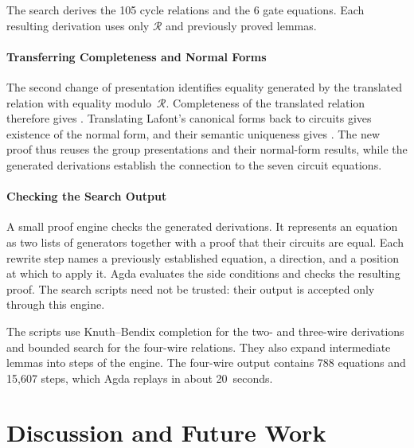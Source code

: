 \documentclass[acmsmall,screen,nonacm]{acmart}
\begin{document}
The search derives the 105 cycle relations and the 6 gate
equations. Each resulting derivation uses only $\mathcal{R}$ and
previously proved lemmas.

\paragraph{Transferring Completeness and Normal Forms}
The second change of presentation identifies equality generated
by the translated relation with equality modulo~$\mathcal{R}$.
Completeness of the translated relation therefore gives
. Translating Lafont's canonical forms
back to circuits gives existence of the normal form, and their
semantic uniqueness gives .
The new proof thus reuses the group presentations and their
normal-form results, while the generated derivations establish
the connection to the seven circuit equations.

\paragraph{Checking the Search Output}
A small proof engine checks the generated derivations.
It represents an equation as two lists of generators together
with a proof that their circuits are equal. Each rewrite step
names a previously established equation, a direction, and a
position at which to apply it. Agda evaluates the side conditions
and checks the resulting proof.
The search scripts need not be trusted: their output is accepted
only through this engine.

The scripts use Knuth--Bendix completion for the two- and three-wire
derivations and bounded search for the four-wire relations.
They also expand intermediate lemmas into steps of the engine.
The four-wire output contains 788 equations and 15,607 steps,
which Agda replays in about 20~seconds.


\section{Discussion and Future Work}\label{sec:conclusion}
\end{document}
